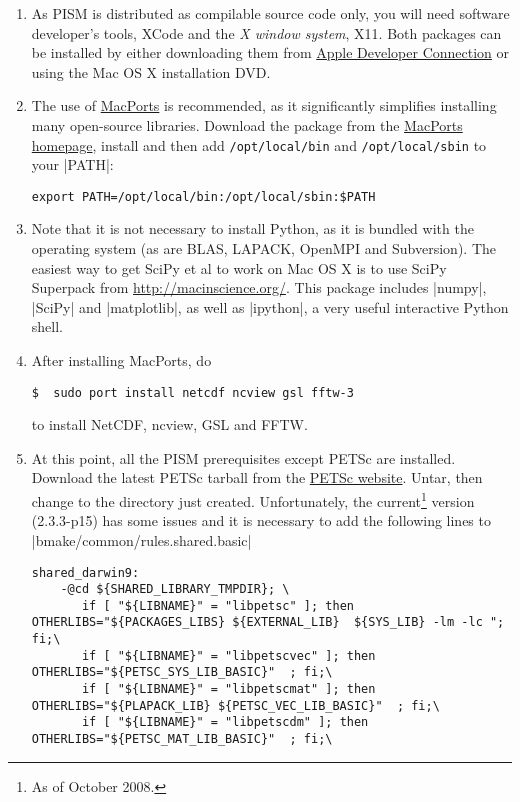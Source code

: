 \documentclass[11pt,final]{amsart}
\begin{document}
\begin{enumerate}
\item As PISM is distributed as compilable source code only, you will need software developer's tools, XCode and the \emph{X
    window system}, X11. Both packages can be installed by either downloading them from
  \href{http://developer.apple.com/tools/xcode/}{Apple Developer Connection} or using the Mac OS X installation DVD.
\item The use of \href{http://www.macports.org/}{MacPorts} is recommended, as it significantly simplifies installing many
  open-source libraries. Download the package from the \href{http://www.macports.org/install.php}{MacPorts homepage}, install and
  then add \verb|/opt/local/bin| and \verb|/opt/local/sbin| to your |PATH|:
\begin{verbatim}
export PATH=/opt/local/bin:/opt/local/sbin:$PATH
\end{verbatim}
\item Note that it is not necessary to install Python, as it is bundled with the operating system (as are BLAS, LAPACK, OpenMPI and
  Subversion). The easiest way to get SciPy et al to work on Mac OS X is to use SciPy Superpack from
  \url{http://macinscience.org/}. This package includes |numpy|, |SciPy| and |matplotlib|, as well as |ipython|, a very useful
  interactive Python shell.
\item After installing MacPorts, do
\begin{verbatim}
$  sudo port install netcdf ncview gsl fftw-3
\end{verbatim}
to install NetCDF, ncview, GSL and FFTW.
\item At this point, all the PISM prerequisites except PETSc are installed. Download the latest PETSc tarball from the
  \href{ftp://ftp.mcs.anl.gov/pub/petsc/release-snapshots/}{PETSc website}. Untar, then change to the directory just created.
  Unfortunately, the current\footnote{As of October 2008.} version (2.3.3-p15) has some issues and it is necessary to add the following lines to
  |bmake/common/rules.shared.basic| {\tiny
\begin{verbatim}
shared_darwin9:
	-@cd ${SHARED_LIBRARY_TMPDIR}; \
       if [ "${LIBNAME}" = "libpetsc" ]; then OTHERLIBS="${PACKAGES_LIBS} ${EXTERNAL_LIB}  ${SYS_LIB} -lm -lc "; fi;\
       if [ "${LIBNAME}" = "libpetscvec" ]; then OTHERLIBS="${PETSC_SYS_LIB_BASIC}"  ; fi;\
       if [ "${LIBNAME}" = "libpetscmat" ]; then OTHERLIBS="${PLAPACK_LIB} ${PETSC_VEC_LIB_BASIC}"  ; fi;\
       if [ "${LIBNAME}" = "libpetscdm" ]; then OTHERLIBS="${PETSC_MAT_LIB_BASIC}"  ; fi;\

\end{verbatim}}
\end{enumerate}
\end{document}
